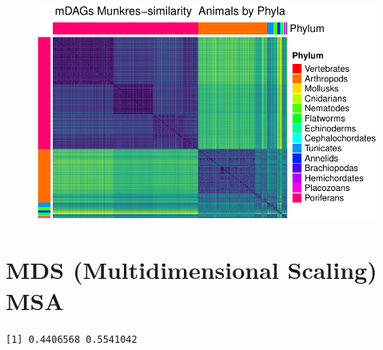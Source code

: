 \documentclass[
  letterpaper,
  DIV=11,
  numbers=noendperiod]{scrreprt}
\newenvironment{Shaded}{}{}
\newcommand{\AttributeTok}[1]{\textcolor[rgb]{0.78,0.47,0.87}{#1}}
\newcommand{\CommentTok}[1]{\textcolor[rgb]{0.36,0.39,0.44}{\textit{#1}}}
\newcommand{\ConstantTok}[1]{\textcolor[rgb]{0.82,0.60,0.40}{#1}}
\newcommand{\DecValTok}[1]{\textcolor[rgb]{0.82,0.60,0.40}{#1}}
\newcommand{\DocumentationTok}[1]{\textcolor[rgb]{0.64,0.20,0.25}{#1}}
\newcommand{\FunctionTok}[1]{\textcolor[rgb]{0.38,0.69,0.94}{#1}}
\newcommand{\NormalTok}[1]{\textcolor[rgb]{0.67,0.70,0.75}{#1}}
\newcommand{\OtherTok}[1]{\textcolor[rgb]{0.15,0.68,0.38}{#1}}
\newcommand{\SpecialCharTok}[1]{\textcolor[rgb]{0.34,0.71,0.76}{#1}}
\begin{document}
\begin{figure}[H]

{\centering \includegraphics[width=1\textwidth,height=\textheight]{index_files/figure-pdf/heatmaps-4.pdf}

}

\end{figure}

\hypertarget{mds-multidimensional-scaling-msa}{%
\section{MDS (Multidimensional Scaling)
MSA}\label{mds-multidimensional-scaling-msa}}

\begin{Shaded}
\end{Shaded}

\begin{verbatim}
[1] 0.4406568 0.5541042
\end{verbatim}
\end{document}
